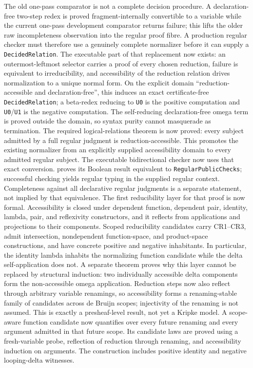\documentclass[11pt]{article}
\newcommand{\code}[1]{\texttt{#1}}
\begin{document}
The old one-pass comparator is not a complete decision procedure.  A declaration-free two-step redex
is proved fragment-internally convertible to a variable while the current
one-pass development comparator returns failure; this lifts the older raw
incompleteness observation into the regular proof fibre.  A production regular
checker must therefore use a genuinely complete normalizer before it can supply
a \code{DecidedRelation}.  The executable part of that replacement now exists:
an outermost-leftmost selector carries a proof of every chosen reduction, failure
is equivalent to irreducibility, and accessibility of the reduction relation
drives normalization to a unique normal form.  On the explicit domain
``reduction-accessible and declaration-free'', this induces an exact
certificate-free \code{DecidedRelation}; a beta-redex reducing to \code{U0} is
the positive computation and \code{U0}/\code{U1} is the negative computation.
The self-reducing declaration-free omega term is proved outside the domain, so
syntax purity cannot masquerade as termination.  The required logical-relations
theorem is now proved: every subject admitted by a full regular judgment is
reduction-accessible.  This promotes the existing normalizer from an explicitly
supplied accessibility domain to every admitted regular subject. The executable
bidirectional checker now uses that exact conversion.
 proves its Boolean result
equivalent to \code{RegularPublicChecks}; successful checking yields regular
typing in the supplied regular context. Completeness against all declarative
regular judgments is a separate statement, not implied by that equivalence.
The first reducibility layer for that proof is now formal.  Accessibility is
closed under dependent function, dependent pair, identity, lambda, pair, and
reflexivity constructors, and it reflects from applications and projections to
their components.  Scoped reducibility candidates carry CR1--CR3, admit
intersection, nondependent function-space, and product-space constructions, and
have concrete positive and negative inhabitants.  In particular, the identity
lambda inhabits the normalizing function candidate while the delta
self-application does not.  A separate theorem proves why this layer cannot be
replaced by structural induction: two individually accessible delta components
form the non-accessible omega application.  Reduction steps now also reflect
through arbitrary variable renamings, so accessibility forms a
renaming-stable family of candidates across de Bruijn scopes; injectivity of the
renaming is not assumed.  This is exactly a presheaf-level result, not yet a
Kripke model.  A scope-aware function candidate now quantifies over every future
renaming and every argument admitted in that future scope.  Its candidate laws
are proved using a fresh-variable probe, reflection of reduction through
renaming, and accessibility induction on arguments.  The construction includes
positive identity and negative looping-delta witnesses.
\end{document}
